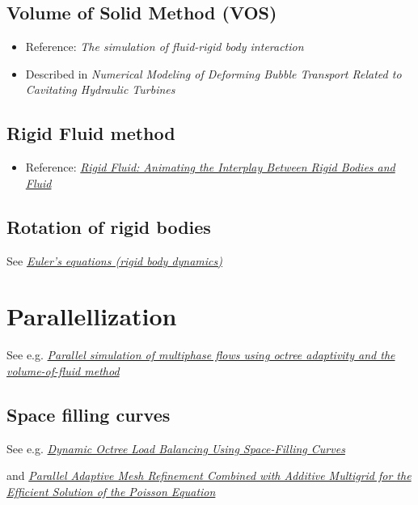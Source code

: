 \subsection{Volume of Solid Method (VOS)}

\begin{itemize}
    \item Reference: \textit{The simulation of fluid-rigid body interaction}
    \item Described in \textit{Numerical Modeling of Deforming Bubble Transport Related to Cavitating Hydraulic Turbines}
\end{itemize}

\subsection{Rigid Fluid method}

\begin{itemize}
    \item Reference: \textit{\href{http://www.amath.unc.edu/Faculty/mucha/Reprints/siggraph04.pdf}{Rigid Fluid: Animating the Interplay Between Rigid Bodies and Fluid}}
\end{itemize}

\subsection{Rotation of rigid bodies}

See \textit{\href{http://en.wikipedia.org/wiki/Euler\%27s_equations_\%28rigid_body_dynamics\%29}{Euler's equations (rigid body dynamics)}}

\section{Parallellization}

See e.g. \textit{\href{http://gfs.sourceforge.net/papers/agbaglah2011.pdf}{Parallel simulation of multiphase flows using octree adaptivity and the volume-of-fluid method}}

\subsection{Space filling curves}

See e.g. \textit{\href{http://j.teresco.org/research/publications/octpart02/octpart02.pdf}{Dynamic Octree Load Balancing Using Space-Filling Curves}}

and \textit{\href{http://downloads.isrn.com/journals/appmath/2012/246491.pdf}{Parallel Adaptive Mesh Refinement Combined with Additive Multigrid for the Efficient Solution of the Poisson Equation}}

